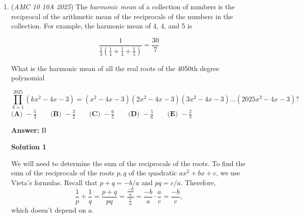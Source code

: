 \begin{enumerate}
 Now, we can factorize these two numbers that $N$ must be a factor of and see where it gets us.

 $273420$ is obviously a multiple of $20$ because it ends in $20$, so long division gets us $273420 = 13671 \cdot 20 = 13671 \cdot 4 \cdot 5$. Since the sum of the digits of $13671$ is $18$, it must be divisible by $9$, so we can divide it by $9$ to get that $13671 = 9 \cdot 1519$, so $273420 = 4 \cdot 1519 \cdot 5 \cdot 9$. $1519$ doesn't look that nice to factor immediately, so we can leave it like that for now. 

 We can do a similar thing for $272745$ to get that it equals $9 \cdot 30305 = 9 \cdot 5 \cdot 6061$. 

 Now, we need to find a common factor between these two that's also greater than $17$. Immediately, we know that $9 \cdot 5 = 45$ works. Since the problem says $N$ is unique, or even just that we know $45$ already works, we can stop here. 

 However, if for some reason you weren't reading carefully or your brain stopped braining and tried to find the highest $N$, you would have checked if $1519$ and $6061$ share any common factors that would increase $N$. The Euclidean Algorithm shows that their $\gcd$ is $1$, so $45$ still is the only solution. Thus, the answer is $\boxed{\text{(E) }4}$. 

 


	\item (\textit{AMC 10 10A 2025}) The \textit{harmonic mean} of a collection of numbers is the reciprocal of the arithmetic mean of the reciprocals of the numbers in the collection. For example, the harmonic mean of 4, 4, and 5 is 


 
 \[\frac{1}{\frac{1}{3}(\frac{1}{4}+\frac{1}{4}+\frac{1}{5})}=\frac{30}{7}\]


 What is the harmonic mean of all the real roots of the 4050th degree polynomial


 
 \[\prod_{k=1}^{2025} (kx^2-4x-3) = (x^2-4x-3)(2x^2-4x-3)(3x^2-4x-3)\dots (2025x^2-4x-3) ?\]
$\textbf{(A) } -\frac{5}{3} \qquad\textbf{(B) } -\frac{3}{2} \qquad\textbf{(C) } -\frac{6}{5} \qquad\textbf{(D) } -\frac{5}{6} \qquad\textbf{(E) } -\frac{2}{3}$

 \textbf{Answer: }B



\textbf{Solution 1}

We will need to determine the sum of the reciprocals of the roots. To find the sum of the reciprocals of the roots $p,q$ of the quadratic $ax^2+bx+c$, we use Vieta's formulas. Recall that $p+q = -b/a$ and $pq = c/a$. Therefore, 
 \[\frac{1}{p} + \frac{1}{q} = \frac{p+q}{pq} = \frac{\frac{-b}{a}}{\frac{c}{a}} = \frac{-b}{a} \cdot \frac{a}{c} = \frac{-b}{c},\]which doesn't depend on $a$.


\end{enumerate}
